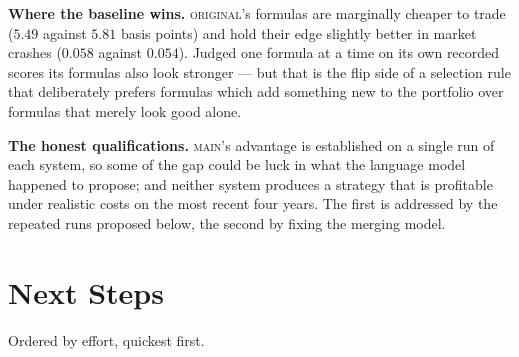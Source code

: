 \documentclass[11pt]{article}
\newcommand{\main}{\textsc{main}}
\newcommand{\orig}{\textsc{original}}
\begin{document}
\noindent \textbf{Where the baseline wins.} \orig{}'s formulas are marginally cheaper
to trade ($5.49$ against $5.81$ basis points) and hold their edge slightly better in
market crashes ($0.058$ against $0.054$). Judged one formula at a time on its own
recorded scores its formulas also look stronger --- but that is the flip side of a
selection rule that deliberately prefers formulas which add something new to the
portfolio over formulas that merely look good alone.

\noindent \textbf{The honest qualifications.} \main{}'s advantage is established on a
single run of each system, so some of the gap could be luck in what the language model
happened to propose; and neither system produces a strategy that is profitable under
realistic costs on the most recent four years. The first is addressed by the repeated
runs proposed below, the second by fixing the merging model.

\section{Next Steps}
\label{sec:next}

Ordered by effort, quickest first.
\end{document}
